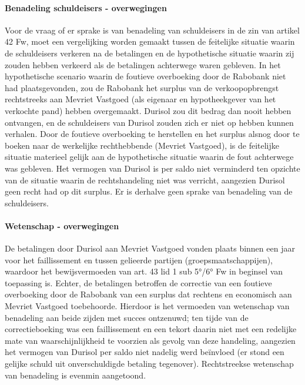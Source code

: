 \documentclass[
  dutch,
  a4paper,
]{article}
\begin{document}
\paragraph{Benadeling schuldeisers - overwegingen}\label{benadeling-schuldeisers---overwegingen-11}

Voor de vraag of er sprake is van benadeling van schuldeisers in de zin van artikel 42 Fw, moet een vergelijking worden gemaakt tussen de feitelijke situatie waarin de schuldeisers verkeren na de betalingen en de hypothetische situatie waarin zij zouden hebben verkeerd als de betalingen achterwege waren gebleven. In het hypothetische scenario waarin de foutieve overboeking door de Rabobank niet had plaatsgevonden, zou de Rabobank het surplus van de verkoopopbrengst rechtstreeks aan Mevriet Vastgoed (als eigenaar en hypotheekgever van het verkochte pand) hebben overgemaakt. Durisol zou dit bedrag dan nooit hebben ontvangen, en de schuldeisers van Durisol zouden zich er niet op hebben kunnen verhalen. Door de foutieve overboeking te herstellen en het surplus alsnog door te boeken naar de werkelijke rechthebbende (Mevriet Vastgoed), is de feitelijke situatie materieel gelijk aan de hypothetische situatie waarin de fout achterwege was gebleven. Het vermogen van Durisol is per saldo niet verminderd ten opzichte van de situatie waarin de rechtshandeling niet was verricht, aangezien Durisol geen recht had op dit surplus. Er is derhalve geen sprake van benadeling van de schuldeisers.

\paragraph{Wetenschap - overwegingen}\label{wetenschap---overwegingen-11}

De betalingen door Durisol aan Mevriet Vastgoed vonden plaats binnen een jaar voor het faillissement en tussen gelieerde partijen (groepsmaatschappijen), waardoor het bewijsvermoeden van art. 43 lid 1 sub 5°/6° Fw in beginsel van toepassing is. Echter, de betalingen betroffen de correctie van een foutieve overboeking door de Rabobank van een surplus dat rechtens en economisch aan Mevriet Vastgoed toebehoorde. Hierdoor is het vermoeden van wetenschap van benadeling aan beide zijden met succes ontzenuwd; ten tijde van de correctieboeking was een faillissement en een tekort daarin niet met een redelijke mate van waarschijnlijkheid te voorzien als gevolg van deze handeling, aangezien het vermogen van Durisol per saldo niet nadelig werd beïnvloed (er stond een gelijke schuld uit onverschuldigde betaling tegenover). Rechtstreekse wetenschap van benadeling is evenmin aangetoond.
\end{document}
